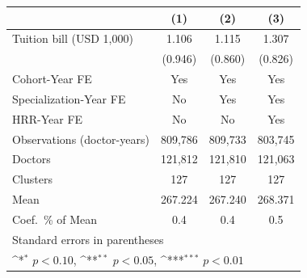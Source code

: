 {
\def\sym#1{\ifmmode^{#1}\else\(^{#1}\)\fi}
\begin{tabular}{l*{3}{c}}
\hline\hline
                    &\multicolumn{1}{c}{(1)}         &\multicolumn{1}{c}{(2)}         &\multicolumn{1}{c}{(3)}         \\
\hline
Tuition bill (USD 1,000)&       1.106         &       1.115         &       1.307         \\
                    &     (0.946)         &     (0.860)         &     (0.826)         \\
[1em]
Cohort-Year FE      &         Yes         &         Yes         &         Yes         \\
[1em]
Specialization-Year FE&          No         &         Yes         &         Yes         \\
[1em]
HRR-Year FE         &          No         &          No         &         Yes         \\
\hline
Observations (doctor-years)&     809,786         &     809,733         &     803,745         \\
Doctors             &     121,812         &     121,810         &     121,063         \\
Clusters            &         127         &         127         &         127         \\
Mean                &     267.224         &     267.240         &     268.371         \\
Coef.\ \% of Mean   &         0.4         &         0.4         &         0.5         \\
\hline\hline
\multicolumn{4}{l}{\footnotesize Standard errors in parentheses}\\
\multicolumn{4}{l}{\footnotesize \sym{*} \(p<0.10\), \sym{**} \(p<0.05\), \sym{***} \(p<0.01\)}\\
\end{tabular}
}
